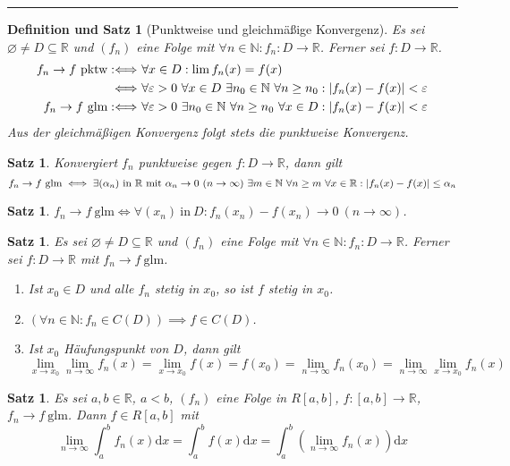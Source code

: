 \documentclass[a4paper]{article}
\newcounter{Sec}
\theoremstyle{marginbreak}
\newtheorem{satz}[definition]{Satz}
\newtheorem{defsatz}[definition]{Definition und Satz}
\newcommand{\sep}{%
	\rule{\textwidth}{0.3pt}%
	\stepcounter{Sec}%
	}
\newcommand{\defiff}{:\Longleftrightarrow}
\newcommand{\en}{~(n\to\infty)}
\renewcommand{\d}[1]{\mathrm{d}#1}
\begin{document}
	\sep
	\begin{defsatz}[Punktweise und gleichmäßige Konvergenz]
		Es sei $\varnothing\neq D\subseteq\mathbb{R}$ und $(f_n)$ eine Folge mit
		$\forall n\in\mathbb{N}:f_n\colon D\to\mathbb{R}$. Ferner sei $f\colon D\to\mathbb{R}$.
		\begin{align*}
			f_n\to f~\text{pktw}
			\defiff&~\forall x\in D:\lim f_n(x)=f(x)\\
			\Longleftrightarrow&~\forall\varepsilon>0~\forall x\in D~\exists n_0\in\mathbb{N}~\forall n\geq n_0:\abs{f_n(x)-f(x)}<\varepsilon\\
			f_n\to f~\text{glm}
			\defiff&~\forall\varepsilon>0~\exists n_0\in\mathbb{N}~\forall n\geq n_0~\forall x\in D:\abs{f_n(x)-f(x)}<\varepsilon
		\end{align*}
		Aus der gleichmäßigen Konvergenz folgt stets die punktweise Konvergenz.
	\end{defsatz}
	\begin{satz}
		Konvergiert $f_n$ punktweise gegen $f\colon D\to\mathbb{R}$, dann gilt
		\[ f_n\to f~\text{glm}\iff\exists(\alpha_n)~\text{in $\mathbb{R}$ mit $\alpha_n\to0\en$}~\exists
		m\in\mathbb{N}~\forall n\geq m~\forall x\in\mathbb{R}:\abs{f_n(x)-f(x)}\leq\alpha_n\]
	\end{satz}
	\begin{satz}
		$f_n\to f~\text{glm}\iff\forall(x_n)~\text{in}~D:f_n(x_n)-f(x_n)\to0\en$.
	\end{satz}
	\begin{satz}
		Es sei $\varnothing\neq D\subseteq\mathbb{R}$ und $(f_n)$ eine Folge mit
		$\forall n\in\mathbb{N}:f_n\colon D\to\mathbb{R}$. Ferner sei $f\colon D\to\mathbb{R}$
		mit $f_n\to f~\text{glm}$.
		\begin{enumerate}[label=(\alph*)]
			\item Ist $x_0\in D$ und alle $f_n$ stetig in $x_0$, so ist $f$ stetig in $x_0$.
			\item $(\forall n\in\mathbb{N}: f_n\in C(D)) \implies f\in C(D)$.
			\item Ist $x_0$ Häufungspunkt von $D$, dann gilt
			\[ \lim_{x\to x_0}\lim_{n\to\infty}f_n(x)=\lim_{x\to x_0}f(x)=f(x_0)=\lim_{n\to\infty}f_n(x_0)=\lim_{n\to\infty}\lim_{x\to x_0}f_n(x) \]
		\end{enumerate}
	\end{satz}
	\begin{satz}
		Es sei $a,b\in\mathbb{R}$, $a<b$, $(f_n)$ eine Folge in $R[a,b]$,
		$f\colon[a,b]\to\mathbb{R}$, $f_n\to f~\text{glm}$. Dann $f\in R[a,b]$ mit
		\[ \lim_{n\to\infty}\int_a^bf_n(x)\d{x}=\int_a^bf(x)\d{x}=\int_a^b(\lim_{n\to\infty}f_n(x))\d{x} \]
	\end{satz}
\end{document}
